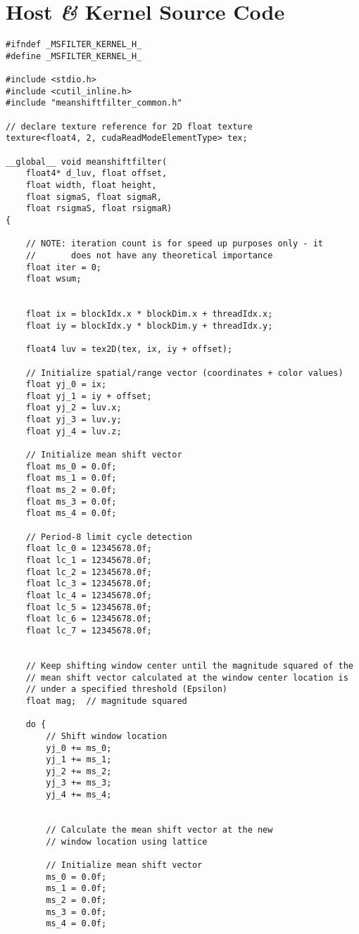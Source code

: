 \chapter{Host \textit{\&} Kernel Source Code }

\begin{lstlisting}[caption=Mean shift kernel, label=lst:msk]
#ifndef _MSFILTER_KERNEL_H_
#define _MSFILTER_KERNEL_H_

#include <stdio.h>
#include <cutil_inline.h>
#include "meanshiftfilter_common.h"

// declare texture reference for 2D float texture
texture<float4, 2, cudaReadModeElementType> tex;

__global__ void meanshiftfilter(
	float4* d_luv, float offset,
	float width, float height,
	float sigmaS, float sigmaR,
	float rsigmaS, float rsigmaR)
{

	// NOTE: iteration count is for speed up purposes only - it
	//       does not have any theoretical importance
	float iter = 0;
	float wsum;
	

	float ix = blockIdx.x * blockDim.x + threadIdx.x;
	float iy = blockIdx.y * blockDim.y + threadIdx.y;
	
	float4 luv = tex2D(tex, ix, iy + offset); 
	
	// Initialize spatial/range vector (coordinates + color values)
	float yj_0 = ix;
	float yj_1 = iy + offset;
	float yj_2 = luv.x;
	float yj_3 = luv.y;
	float yj_4 = luv.z;

	// Initialize mean shift vector
	float ms_0 = 0.0f;
	float ms_1 = 0.0f;
	float ms_2 = 0.0f;
	float ms_3 = 0.0f;
	float ms_4 = 0.0f;

	// Period-8 limit cycle detection
	float lc_0 = 12345678.0f;
	float lc_1 = 12345678.0f;
	float lc_2 = 12345678.0f;
	float lc_3 = 12345678.0f;
	float lc_4 = 12345678.0f;
	float lc_5 = 12345678.0f;
	float lc_6 = 12345678.0f;
	float lc_7 = 12345678.0f;
	 

	// Keep shifting window center until the magnitude squared of the
	// mean shift vector calculated at the window center location is
	// under a specified threshold (Epsilon)
	float mag;  // magnitude squared
	
	do {
		// Shift window location
		yj_0 += ms_0;
		yj_1 += ms_1;
		yj_2 += ms_2;
		yj_3 += ms_3;
		yj_4 += ms_4;


		// Calculate the mean shift vector at the new
		// window location using lattice

		// Initialize mean shift vector
		ms_0 = 0.0f;
		ms_1 = 0.0f;
		ms_2 = 0.0f;
		ms_3 = 0.0f;
		ms_4 = 0.0f;


\end{lstlisting}
